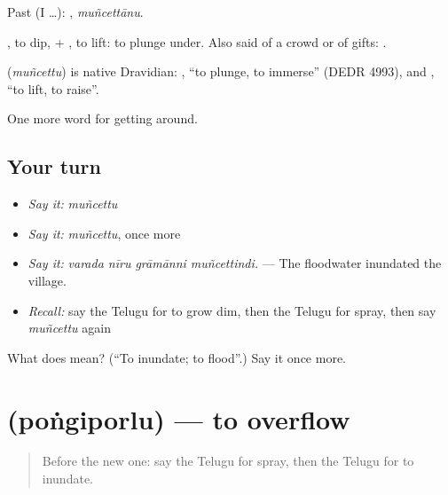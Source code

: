 Past (I …): , \emph{muñcettānu}.

, to dip, + , to lift: to plunge under. Also said of a crowd or of gifts:  .

\begin{cousinweb}
\textbf{} (\emph{muñcettu}) is native Dravidian: , \textquotedblleft{}to plunge, to immerse\textquotedblright{} (DEDR 4993), and , \textquotedblleft{}to lift, to raise\textquotedblright{}.
\end{cousinweb}

\begin{grammarlens}[title={What you've built}]
One more word for getting around.
\end{grammarlens}

\subsection*{Your turn}
\begin{itemize}
\raggedright
  \item \emph{Say it:} \emph{muñcettu}
  \item \emph{Say it:} \emph{muñcettu}, once more
  \item \emph{Say it:} \emph{varada nīru grāmānni muñcettindi.} — The floodwater inundated the village.
  \item \emph{Recall:} say the Telugu for to grow dim, then the Telugu for spray, then say \emph{muñcettu} again
\end{itemize}

\begin{tcolorbox}[breakable,colback=teal!4,colframe=teal!35!black,title={Before you move on}]
What does  mean? (\textquotedblleft{}To inundate; to flood\textquotedblright{}.) Say it once more.
\end{tcolorbox}
\section[\texorpdfstring{\te{పొంగిపొర్లు} (poṅgiporlu)}{పొంగిపొర్లు (poṅgiporlu)}]{ (poṅgiporlu) — to overflow}

\label{lesson:TE-C480-pongiporlu}



\begin{quote}
Before the new one: say the Telugu for spray, then the Telugu for to inundate.
\end{quote}

